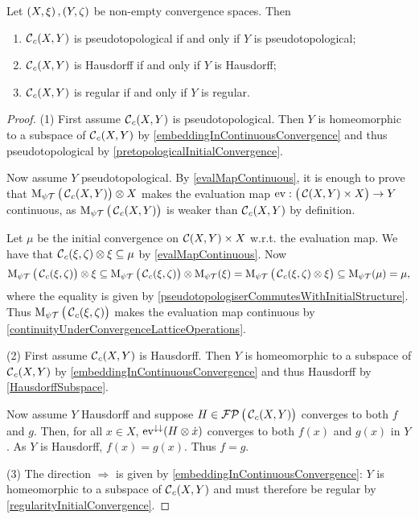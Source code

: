 \begin{proposition} \label{continuousConvergencePropertiesFromCodomain}
Let $\left( X,\xi \right), \left( Y,\zeta \right)$ be non-empty convergence spaces. Then
\begin{enumerate}
\item $\operatorname{\mathcal{C}}_c(X,Y)$ is pseudotopological \textup{if and only if} $Y$ is pseudotopological;
\item $\operatorname{\mathcal{C}}_c(X,Y)$ is Hausdorff \textup{if and only if} $Y$ is Hausdorff;
\item $\operatorname{\mathcal{C}}_c(X,Y)$ is regular \textup{if and only if} $Y$ is regular.
\end{enumerate}
\end{proposition}
\begin{proof}
(1) First assume $\operatorname{\mathcal{C}}_c(X,Y)$ is pseudotopological. Then $Y$ is homeomorphic to a subspace of $\operatorname{\mathcal{C}}_c(X,Y)$ by \ref{embeddingInContinuousConvergence} and thus pseudotopological by \ref{pretopologicalInitialConvergence}.

Now assume $Y$ pseudotopological. By \ref{evalMapContinuous}, it is enough to prove that $\operatorname{M_{\psi\mathcal{T}}}\big(\operatorname{\mathcal{C}}_c(X,Y)\big)\otimes X$ makes the evaluation map $\operatorname{ev}: \big(\operatorname{\mathcal{C}}(X,Y)\times X\big) \to Y$ continuous, as $\operatorname{M_{\psi\mathcal{T}}}\big(\operatorname{\mathcal{C}}_c(X,Y)\big)$ is weaker than $\operatorname{\mathcal{C}}_c(X,Y)$ by definition.

Let $\mu$ be the initial convergence on $\operatorname{\mathcal{C}}(X,Y)\times X$ w.r.t. the evaluation map. We have that $\operatorname{\mathcal{C}}_c(\xi,\zeta)\otimes \xi \subseteq \mu$ by \ref{evalMapContinuous}. Now
\[ \operatorname{M_{\psi\mathcal{T}}}\big(\operatorname{\mathcal{C}}_c(\xi,\zeta)\big)\otimes \xi \subseteq \operatorname{M_{\psi\mathcal{T}}}\big(\operatorname{\mathcal{C}}_c(\xi,\zeta)\big)\otimes \operatorname{M_{\psi\mathcal{T}}}(\xi) = \operatorname{M_{\psi\mathcal{T}}}\big(\operatorname{\mathcal{C}}_c(\xi,\zeta)\otimes \xi\big) \subseteq \operatorname{M_{\psi\mathcal{T}}}(\mu) = \mu, \]
where the equality is given by \ref{pseudotopologiserCommutesWithInitialStructure}. Thus $\operatorname{M_{\psi\mathcal{T}}}\big(\operatorname{\mathcal{C}}_c(\xi,\zeta)\big)$ makes the evaluation map continuous by \ref{continuityUnderConvergenceLatticeOperations}.

(2) First assume $\operatorname{\mathcal{C}}_c(X,Y)$ is Hausdorff. Then $Y$ is homeomorphic to a subspace of $\operatorname{\mathcal{C}}_c(X,Y)$ by \ref{embeddingInContinuousConvergence} and thus Hausdorff by \ref{HausdorffSubspace}.

Now assume $Y$ Hausdorff and suppose $H\in \operatorname{\mathcal{FP}}\big(\operatorname{\mathcal{C}}_c(X,Y)\big)$ converges to both $f$ and $g$. Then, for all $x\in X$, $\operatorname{ev}^{\downarrow\downarrow}(H\otimes \dot{x})$ converges to both $f(x)$ and $g(x)$ in $Y$. As $Y$ is Hausdorff, $f(x) = g(x)$. Thus $f=g$.

(3) The direction $\Rightarrow$ is given by \ref{embeddingInContinuousConvergence}: $Y$ is homeomorphic to a subspace of $\operatorname{\mathcal{C}}_c(X,Y)$ and must therefore be regular by \ref{regularityInitialConvergence}.


\end{proof}

